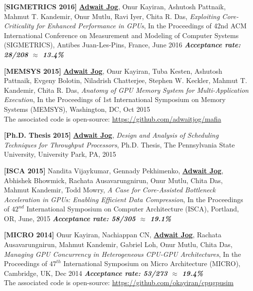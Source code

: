 \documentclass[10pt,a4]{article}
\begin{document}
\begin{description}
\item
\item{\bf [SIGMETRICS 2016]} 
{\bf \underline{Adwait Jog}}, Onur Kayiran, Ashutosh Pattnaik, Mahmut T. Kandemir, 
Onur Mutlu, Ravi Iyer, Chita R. Das, {\it Exploiting Core-Criticality for Enhanced Performance in GPUs}, 
In the Proceedings of 42nd ACM International Conference on Measurement and Modeling of Computer Systems (SIGMETRICS), Antibes Juan-Les-Pins, France, June 2016 
\textbf{\textit{Acceptance rate: 28/208 $\approx$ 13.4\%}}

\item 
{\bf [MEMSYS 2015]}
{\bf \underline{Adwait Jog}}, Onur Kayiran, Tuba Kesten, Ashutosh Pattnaik, Evgeny Bolotin, Niladrish Chatterjee, 
Stephen W. Keckler, Mahmut T. Kandemir, Chita R. Das, 
{\it Anatomy of GPU Memory System for Multi-Application Execution}, 
In the Proceedings of 1st International Symposium on Memory Systems (MEMSYS), Washington, DC, Oct 2015 \\
The associated code is open-source: \url{https://github.com/adwaitjog/mafia}

\item 
{\bf [Ph.D. Thesis 2015]}
{\bf \underline{Adwait Jog}}, {\it Design and Analysis of Scheduling Techniques for Throughput Processors}, 
Ph.D. Thesis, The Pennsylvania State University, University Park, PA, 2015

\item 
{\bf [ISCA 2015]}
Nandita Vijaykumar, Gennady Pekhimenko, {\bf \underline{Adwait Jog}}, Abhishek Bhowmick, Rachata Ausavarungnirun, Onur Mutlu, Chita Das, Mahmut Kandemir, Todd Mowry,
{\it A Case for Core-Assisted Bottleneck Acceleration in GPUs: Enabling Efficient Data Compression},
In the Proceedings of $42^{nd}$ International Symposium on Computer Architecture (ISCA), Portland, OR, June, 2015
\textbf{\textit{Acceptance rate: 58/305 $\approx$ 19.1\%}}

\item{\bf [MICRO 2014]} 
Onur Kayiran, Nachiappan CN, {\bf \underline{Adwait Jog}}, Rachata Ausavarungnirun, 
Mahmut Kandemir, Gabriel Loh, Onur Mutlu, Chita Das, 
{\it Managing GPU Concurrency in Heterogeneous CPU-GPU Architectures}, 
In the Proceedings of $47^{th}$ International Symposium on Micro Architecture (MICRO), Cambridge, UK, Dec 2014
\textbf{\textit{Acceptance rate: 53/273 $\approx$ 19.4\%}} \\
The associated code is open-source: \url{https://github.com/okayiran/cpugpusim}


\end{description}
\end{document}
